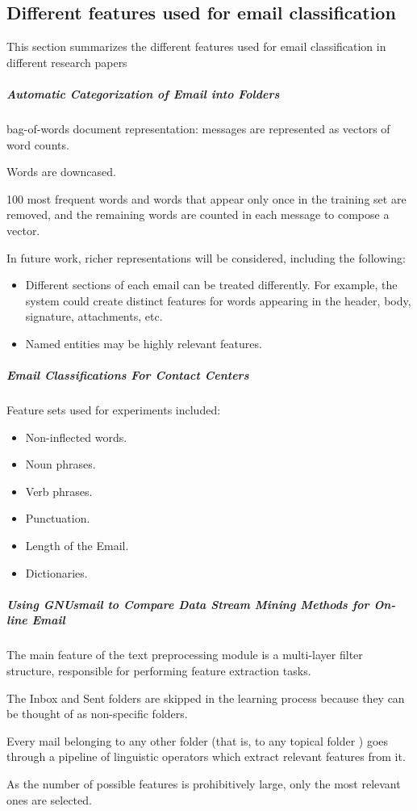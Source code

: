 \subsection{Different features used for email classification}
This section summarizes the different features used for email classification in different research papers
    \subparagraph{Automatic Categorization of Email into Folders \cite{RON04}}
	\begin{my_itemize}
		\item bag-of-words document representation: messages are represented as vectors of word counts.
		\item Words are downcased.
		\item 100 most frequent words and words that appear only once in the training set are removed, and the remaining words are counted in each message to compose a vector.
		\item In future work, richer representations will be considered, including the following:
			\begin{itemize}
				\item Different sections of each email can be treated differently. For example, the system could create distinct features for words appearing in the header, body, signature, attachments, etc.
				\item Named entities may be highly relevant features.
			\end{itemize}
	\end{my_itemize}

    \subparagraph{Email Classifications For Contact Centers \cite{ANI03}}
		\begin{my_itemize}
			\item Feature sets used for experiments included:
				\begin{itemize}
					\item Non-inflected words.
					\item Noun phrases.
					\item Verb phrases.
					\item Punctuation.
					\item Length of the Email.
					\item Dictionaries.
				\end{itemize}
		\end{my_itemize}

	\subparagraph{Using GNUsmail to Compare Data Stream Mining Methods for On-line Email \cite{JOSE11}}
		\begin{my_itemize}
			\item The main feature of the text preprocessing module is a multi-layer filter structure, responsible for performing feature extraction tasks.
			\item The Inbox and Sent folders are skipped in the learning process because they can be thought of as non-specific folders.
			\item Every mail belonging to any other folder (that is, to any topical folder ) goes through a pipeline of linguistic operators which extract relevant features from it.
			\item As the number of possible features is prohibitively large, only the most relevant ones are selected.
		\end{my_itemize}
   
